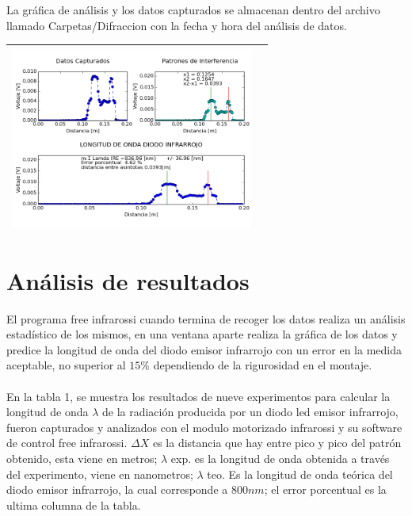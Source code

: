 \documentclass[12]{article}
\newenvironment{Figure}
{\par\medskip\noindent\minipage{\linewidth}}
{\endminipage\par\medskip}
\begin{document}
\begin{multicols}{2}
La gráfica de análisis y los datos capturados se almacenan dentro del archivo llamado Carpetas/Difraccion con la fecha y hora del análisis de datos.
\begin{Figure}	
\center
\begin{tabular}{|l|r|}
\hline
\includegraphics[width=8cm, height=6cm]{img/Graficas.png} \\ \hline
\end{tabular}
\label{fig:g4}
\end{Figure}
\section{Análisis de resultados}
El programa free infrarossi cuando termina de recoger los datos realiza un análisis estadístico de los mismos, en una ventana aparte realiza la gráfica de los datos y predice la longitud de onda del diodo emisor infrarrojo con un error en la medida aceptable, no superior al $15\%$ dependiendo de la rigurosidad en el montaje.\\\\
En la tabla 1, se muestra los resultados de nueve experimentos para calcular la longitud de onda $\lambda$ de la radiación producida por un diodo led emisor infrarrojo, fueron capturados y analizados con el modulo motorizado infrarossi y su software de control free infrarossi. $\Delta X$ es la distancia que hay entre pico y pico del patrón obtenido, esta viene en metros; $\lambda$ exp.  es la longitud de onda obtenida a través del experimento, viene en nanometros; $\lambda$ teo. Es la longitud de onda teórica del diodo emisor infrarrojo,  la cual corresponde a $800 nm$; el error porcentual es la ultima columna  de la tabla.


\end{multicols}
\end{document}

